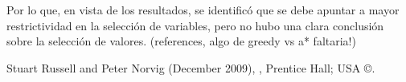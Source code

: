 \documentclass[%
    final,
    reprint,
    notitlepage,
    narroweqnarray,
    inline,
    twoside,
    invited
    ]{ieee}
\begin{document}
Por lo que, en vista de los resultados, se identificó que se debe apuntar a mayor restrictividad 
en la selección de variables, pero no hubo una clara conclusión sobre la selección de valores.
(references, algo de greedy vs a* faltaria!)
%
%
%
%
%


\begin{thebibliography}{1}

Stuart Russell and Peter Norvig (December 2009),
,
\newblock Prentice Hall; USA \copyright.







\end{thebibliography}



\clearpage


\onecolumn
\end{document}
